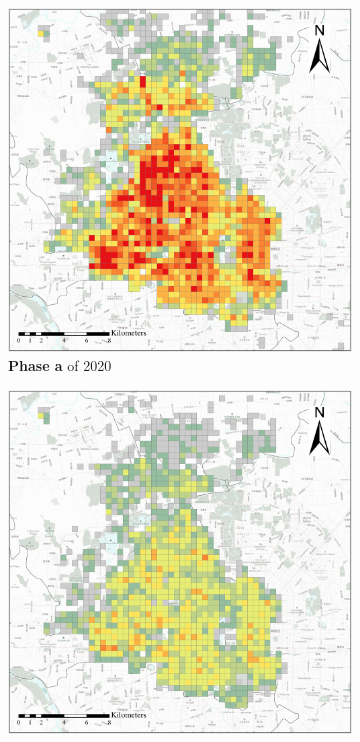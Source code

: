 \documentclass[preprints,ijgi,submit,moreauthors]{Definitions/mdpi}
\begin{document}
\begin{figure}[ht]
    \centering
    \begin{subfigure}{.28\textwidth}
        \includegraphics[width=\textwidth]{Figures/BSSPhase1_2020.eps}
        \caption{\textbf{Phase a} of 2020}\label{fig:p_a_2020}
    \end{subfigure}
    \begin{subfigure}{.28\textwidth}
        \includegraphics[width=\textwidth]{Figures/BSSPhase2_2020.eps}

\end{subfigure}
\end{figure}
\end{document}
